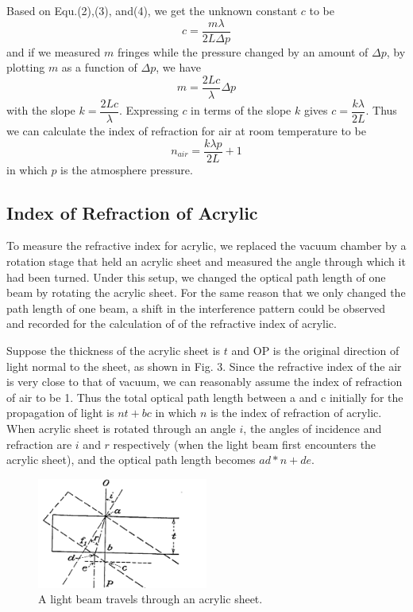 \documentclass[12pt]{article}
\begin{document}
Based on Equ.(2),(3), and(4), we get the unknown constant $c$ to be 
\begin{equation}
	c=\dfrac{m\lambda}{2L\Delta{p}}
\end{equation} 
and if we measured $m$ fringes while the pressure changed by an amount of $\Delta{p}$, by plotting $m$ as a function of $\Delta{p}$, we have 
\begin{equation}
	m=\dfrac{2Lc}{\lambda}\Delta{p}
\end{equation}
with the slope $k=\dfrac{2Lc}{\lambda}$. Expressing $c$ in terms of the slope $k$ gives $c=\dfrac{k\lambda}{2L}$. Thus we can calculate the index of refraction for air at room temperature to be 
\begin{equation}
	n_{air}=\dfrac{k\lambda{p}}{2L}+1
\end{equation}
in which $p$ is the atmosphere pressure.

\subsection{Index of Refraction of Acrylic}
To measure the refractive index for acrylic, we replaced the vacuum chamber by a rotation stage that held an acrylic sheet and measured the angle through which it had been turned. Under this setup, we changed the optical path length of one beam by rotating the acrylic sheet. For the same reason that we only changed the path length of one beam, a shift in the interference pattern could be observed and recorded for the calculation of of the refractive index of acrylic. 

Suppose the thickness of the acrylic sheet is $t$ and OP is the original direction of light normal to the sheet, as shown in Fig. 3. Since the refractive index of the air is very close to that of vacuum, we can reasonably assume the index of refraction of air to be 1. Thus the total optical path length between a and c initially for the propagation of light is $nt+bc$ in which $n$ is the index of refraction of acrylic. When acrylic sheet is rotated through an angle $i$, the angles of incidence and refraction are $i$ and $r$ respectively (when the light beam first encounters the acrylic sheet), and the optical path length becomes $ad*n+de$.

\begin{figure}[htb]
	\begin{center}
		\includegraphics[width=0.5\textwidth]{picture4} %
		\caption{A light beam travels through an acrylic sheet.}
	\end{center}
\end{figure}
\end{document}
